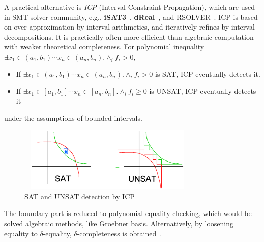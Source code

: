 \documentclass[runningheads,a4paper,oribibl]{llncs}
\begin{document}
A practical alternative is {\em ICP} (Interval Constraint Propagation), 
which are used in SMT solver community, e.g., {\bf iSAT3}~\cite{isat}, 
{\bf dReal}~\cite{dRealCADE13}, and RSOLVER~\cite{rsolver}. 
ICP is based on over-approximation by interval arithmetics, and iteratively refines by
interval decompositions. 
It is practically often more efficient than algebraic computation 
with weaker theoretical completeness. 
For polynomial inequality 
$\exists x_1 \in (a_1,b_1) \cdots x_n \in (a_n,b_n) . \wedge_{i} f_i > 0$, 
\begin{itemize}
\item If $\exists x_1 \in (a_1,b_1) \cdots x_n \in (a_n,b_n) . \wedge_{i} f_i > 0$ is SAT, 
ICP eventually detects it. 
\item If $\exists x_1 \in [a_1,b_1] \cdots x_n \in [a_n,b_n] . \wedge_{i} f_i \geq 0$ is UNSAT, 
ICP eventually detects it
\end{itemize}
under the assumptions of bounded intervals. 
\begin{figure}[ht]
\centering
\includegraphics[height=1.2in,width=3.4in]{FigCompleteness.eps} 
\caption{SAT and UNSAT detection by ICP} 
\label{fig:complete} 
\end{figure} 

The boundary part is reduced to polynomial equality checking, 
which would be solved algebraic methods, like Groebner basis. 
Alternatively, by loosening equality to $\delta$-equality, 
$\delta$-completeness is obtained~\cite{dRealIJCAR12,dRealLICS12}. 
\end{document}
